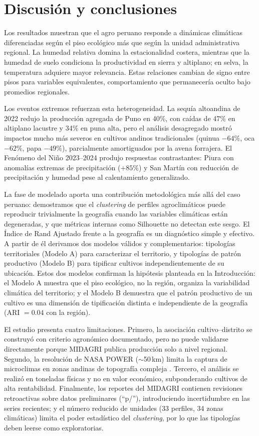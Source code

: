 \documentclass[conference]{IEEEtran}
\begin{document}
\section{Discusión y conclusiones}
Los resultados muestran que el agro peruano responde a dinámicas climáticas diferenciadas según el piso ecológico más que según la unidad administrativa regional. La humedad relativa domina la estacionalidad costera, mientras que la humedad de suelo condiciona la productividad en sierra y altiplano; en selva, la temperatura adquiere mayor relevancia. Estas relaciones cambian de signo entre pisos para variables equivalentes, comportamiento que permanecería oculto bajo promedios regionales.

Los eventos extremos refuerzan esta heterogeneidad. La sequía altoandina de 2022 redujo la producción agregada de Puno en 40\%, con caídas de 47\% en altiplano lacustre y 34\% en puna alta, pero el análisis desagregado mostró impactos mucho más severos en cultivos andinos tradicionales (quinua $-64\%$, oca $-62\%$, papa $-49\%$), parcialmente amortiguados por la avena forrajera. El Fenómeno del Niño 2023--2024 produjo respuestas contrastantes: Piura con anomalías extremas de precipitación ($+85\%$) y San Martín con reducción de precipitación y humedad pese al calentamiento generalizado.

La fase de modelado aporta una contribución metodológica más allá del caso peruano: demostramos que el \textit{clustering} de perfiles agroclimáticos puede reproducir trivialmente la geografía cuando las variables climáticas están degeneradas, y que métricas internas como Silhouette no detectan este sesgo. El Índice de Rand Ajustado frente a la geografía es un diagnóstico simple y efectivo. A partir de él derivamos dos modelos válidos y complementarios: tipologías territoriales (Modelo A) para caracterizar el territorio, y tipologías de patrón productivo (Modelo B) para tipificar cultivos independientemente de su ubicación. Estos dos modelos confirman la hipótesis planteada en la Introducción: el Modelo A muestra que el piso ecológico, no la región, organiza la variabilidad climática del territorio; y el Modelo B demuestra que el patrón productivo de un cultivo es una dimensión de tipificación distinta e independiente de la geografía (ARI $=0.04$ con la región).

El estudio presenta cuatro limitaciones. Primero, la asociación cultivo--distrito se construyó con criterio agronómico documentado, pero no puede validarse directamente porque MIDAGRI publica producción solo a nivel regional. Segundo, la resolución de NASA POWER ($\sim$50\,km) limita la captura de microclimas en zonas andinas de topografía compleja \cite{ramirez2012}. Tercero, el análisis se realizó en toneladas físicas y no en valor económico, subponderando cultivos de alta rentabilidad. Finalmente, los reportes del MIDAGRI contienen revisiones retroactivas sobre datos preliminares (``p/''), introduciendo incertidumbre en las series recientes; y el número reducido de unidades (33 perfiles, 34 zonas climáticas) limita el poder estadístico del \textit{clustering}, por lo que las tipologías deben leerse como exploratorias.
\end{document}
